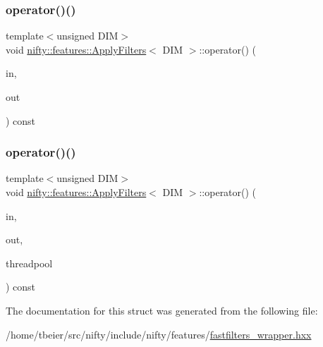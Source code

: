 \subsubsection{\texorpdfstring{operator()()}{operator()()}\hspace{0.1cm}{\footnotesize\ttfamily [1/2]}}
{\footnotesize\ttfamily template$<$unsigned D\+IM$>$ \\
void \hyperlink{structnifty_1_1features_1_1ApplyFilters}{nifty\+::features\+::\+Apply\+Filters}$<$ D\+IM $>$\+::operator() (\begin{DoxyParamCaption}\item[{const \hyperlink{classandres_1_1View}{marray\+::\+View}$<$ float $>$ \&}]{in,  }\item[{\hyperlink{classandres_1_1View}{marray\+::\+View}$<$ float $>$ \&}]{out }\end{DoxyParamCaption}) const\hspace{0.3cm}{\ttfamily [inline]}}

\mbox{\label{structnifty_1_1features_1_1ApplyFilters_af1316760b67e21d2c3f647313942f087}} 
\subsubsection{\texorpdfstring{operator()()}{operator()()}\hspace{0.1cm}{\footnotesize\ttfamily [2/2]}}
{\footnotesize\ttfamily template$<$unsigned D\+IM$>$ \\
void \hyperlink{structnifty_1_1features_1_1ApplyFilters}{nifty\+::features\+::\+Apply\+Filters}$<$ D\+IM $>$\+::operator() (\begin{DoxyParamCaption}\item[{const \hyperlink{classandres_1_1View}{marray\+::\+View}$<$ float $>$ \&}]{in,  }\item[{\hyperlink{classandres_1_1View}{marray\+::\+View}$<$ float $>$ \&}]{out,  }\item[{\hyperlink{classnifty_1_1parallel_1_1ThreadPool}{parallel\+::\+Thread\+Pool} \&}]{threadpool }\end{DoxyParamCaption}) const\hspace{0.3cm}{\ttfamily [inline]}}



The documentation for this struct was generated from the following file\+:\begin{DoxyCompactItemize}
\item 
/home/tbeier/src/nifty/include/nifty/features/\hyperlink{fastfilters__wrapper_8hxx}{fastfilters\+\_\+wrapper.\+hxx}\end{DoxyCompactItemize}
